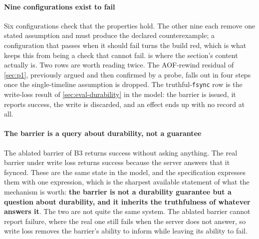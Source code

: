 \paragraph{Nine configurations exist to fail} Six configurations check that the
properties hold. The other nine each remove one stated assumption and must
produce the declared counterexample; a configuration that passes when it should
fail turns the build red, which is what keeps this from being a check that
cannot fail.  is where the section's content actually
is. Two rows are worth reading twice. The AOF-rewind
residual of \cref{sec:p1}, previously argued and then confirmed by a probe,
falls out in four steps once the single-timeline assumption is dropped. The
truthful-\texttt{fsync} row is the write-loss result of
\cref{sec:eval-durability} in the model: the barrier is issued, it reports
success, the write is discarded, and an effect ends up with no record at all.

\paragraph{The barrier is a query about durability, not a guarantee} The
ablated barrier of B3 returns success without asking anything. The real barrier
under write loss returns success because the server answers that it fsynced.
These are the same state in the model, and the specification expresses them with
one expression, which is the sharpest available statement of what the mechanism
is worth: \textbf{the barrier is not a durability guarantee but a question about
durability, and it inherits the truthfulness of whatever answers it}. The two
are not quite the same system. The ablated barrier cannot report failure,
where the real one still fails when the server does not answer, so write loss
removes the barrier's ability to inform while leaving its ability to fail.

